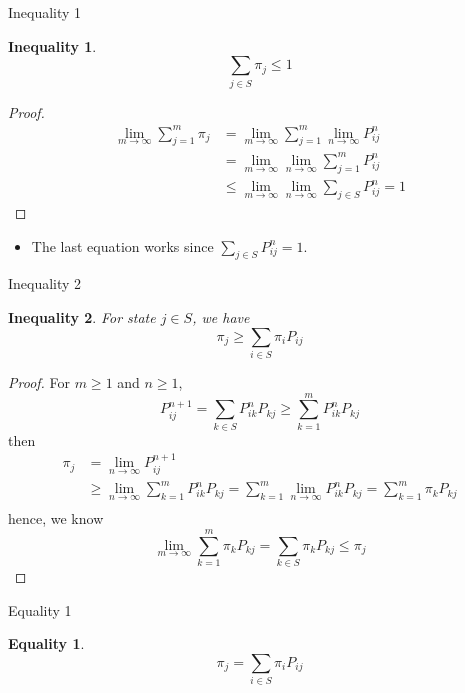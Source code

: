 \documentclass{beamer}
\newtheorem{ineq}{Inequality}
\newtheorem{eq}{Equality}
\begin{document}
\begin{frame}{Inequality 1}
	\begin{ineq}
		\[
		\sum_{j \in S} \pi_j \leq 1
		\]
	\end{ineq}
\end{frame}

\begin{frame}
	\begin{proof}
		\begin{align*}
			\lim_{m \to \infty} \sum_{j=1}^m \pi_j &= \lim_{m \to \infty} \sum_{j=1}^m \lim_{n \to \infty} P^n_{ij} \\
			&= \lim_{m \to \infty} \lim_{n \to \infty} \sum_{j=1}^m P^n_{ij} \\
			&\leq \lim_{m \to \infty} \lim_{n \to \infty} \sum_{j \in S} P^n_{ij} = 1
		\end{align*}
	\end{proof}
	\begin{itemize}
		\item The last equation works since $\sum_{j \in S} P^n_{ij} = 1$.
	\end{itemize}
\end{frame}

\begin{frame}{Inequality 2}
	\begin{ineq}
		For state $j \in S$, we have
		\[
		\pi_j \geq \sum_{i \in S} \pi_i P_{ij}
		\]
	\end{ineq}
\end{frame}

\begin{frame}[shrink]
	\begin{proof}
		For $m \geq 1$ and $n \geq 1$,
		\[
		P^{n+1}_{ij} = \sum_{k \in S} P^n_{ik} P_{kj} \geq \sum_{k=1}^m P^n_{ik} P_{kj}
		\]
		then
		\begin{align*}
			\pi_j &= \lim_{n \to \infty} P^{n+1}_{ij} \\
			&\geq \lim_{n \to \infty} \sum_{k=1}^m P^n_{ik} P_{kj} 
			 = \sum_{k=1}^m \lim_{n \to \infty} P^n_{ik} P_{kj} 
			 = \sum_{k=1}^m \pi_k P_{kj}\\
		\end{align*}
		hence, we know
		\[
		\lim_{m\to\infty} \sum_{k=1}^m \pi_k P_{kj} = \sum_{k \in S} \pi_k P_{kj} \leq \pi_j
		\]
	\end{proof}
\end{frame}

\begin{frame}{Equality 1}
	\begin{eq}
		\[
		\pi_j = \sum_{i \in S} \pi_i P_{ij}
		\]
	\end{eq}
\end{frame}
\end{document}
